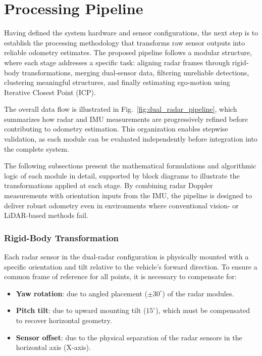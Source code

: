 \section{Processing Pipeline}
\label{sec:processing_pipeline}

Having defined the system hardware and sensor configurations, the next step is to establish the processing methodology that transforms raw sensor outputs into reliable odometry estimates.  
The proposed pipeline follows a modular structure, where each stage addresses a specific task: aligning radar frames through rigid-body transformations, merging dual-sensor data, filtering unreliable detections, clustering meaningful structures, and finally estimating ego-motion using Iterative Closest Point (ICP).  

The overall data flow is illustrated in Fig.~\ref{fig:dual_radar_pipeline}, which summarizes how radar and IMU measurements are progressively refined before contributing to odometry estimation.  
This organization enables stepwise validation, as each module can be evaluated independently before integration into the complete system.  

The following subsections present the mathematical formulations and algorithmic logic of each module in detail, supported by block diagrams to illustrate the transformations applied at each stage.  
By combining radar Doppler measurements with orientation inputs from the IMU, the pipeline is designed to deliver robust odometry even in environments where conventional vision- or LiDAR-based methods fail.

\vspace{0.5em}
\subsubsection{Rigid-Body Transformation}  

Each radar sensor in the dual-radar configuration is physically mounted with a specific orientation and tilt relative to the vehicle's forward direction. 
To ensure a common frame of reference for all points, it is necessary to compensate for:

\begin{itemize}
    \item \textbf{Yaw rotation}: due to angled placement ($\pm30^\circ$) of the radar modules.
    \item \textbf{Pitch tilt}: due to upward mounting tilt ($15^\circ$), which must be compensated to recover horizontal geometry.
    \item \textbf{Sensor offset}: due to the physical separation of the radar sensors in the horizontal axis (X-axis).
\end{itemize}

